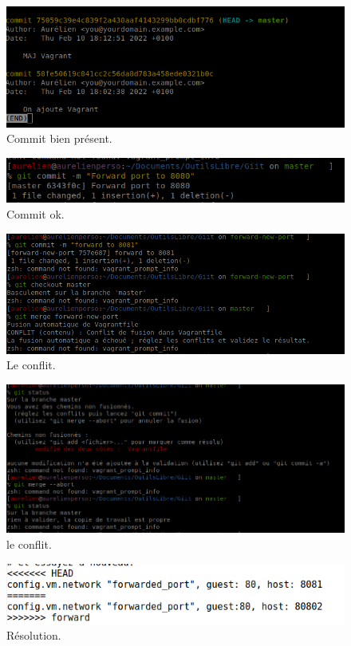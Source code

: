 \documentclass{article}
\begin{document}
\subsection{}

\begin{figure}[h]
\centering
\includegraphics[width=0.7\columnwidth]{screen/git3.png}
\caption{\label{fig:frog}Commit bien présent.}
\end{figure}

\begin{figure}[h]
\centering
\includegraphics[width=0.7\columnwidth]{screen/git3_1.png}
\caption{\label{fig:frog}Commit ok.}
\end{figure}

\begin{figure}[h]
\centering
\includegraphics[width=0.7\columnwidth]{screen/git3_2.png}
\caption{\label{fig:frog}Le conflit.}
\end{figure}

\begin{figure}[h]
\centering
\includegraphics[width=0.7\columnwidth]{screen/git3_3.png}
\caption{\label{fig:frog}le conflit.}
\end{figure}

\begin{figure}[h]
\centering
\includegraphics[width=0.7\columnwidth]{screen/git3_4.png}
\caption{\label{fig:frog}Résolution.}
\end{figure}
\end{document}
